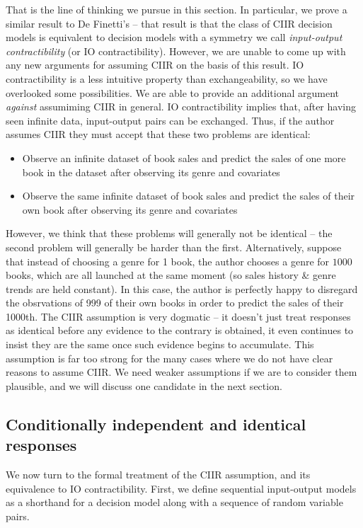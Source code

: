 That is the line of thinking we pursue in this section. In particular, we prove a similar result to De Finetti's -- that result is that the class of CIIR decision models is equivalent to decision models with a symmetry we call \emph{input-output contractibility} (or IO contractibility). However, we are unable to come up with any new arguments for assuming CIIR on the basis of this result. IO contractibility is a less intuitive property than exchangeability, so we have overlooked some possibilities. We are able to provide an additional argument \emph{against} assumiming CIIR in general. IO contractibility implies that, after having seen infinite data, input-output pairs can be exchanged. Thus, if the author assumes CIIR they must accept that these two problems are identical:
\begin{itemize}
    \item Observe an infinite dataset of book sales and predict the sales of one more book in the dataset after observing its genre and covariates
    \item Observe the same infinite dataset of book sales and predict the sales of their own book after observing its genre and covariates
\end{itemize}
However, we think that these problems will generally not be identical -- the second problem will generally be harder than the first. Alternatively, suppose that instead of choosing a genre for 1 book, the author chooses a genre for $1000$ books, which are all launched at the same moment (so sales history & genre trends are held constant). In this case, the author is perfectly happy to disregard the obsrvations of 999 of their own books in order to predict the sales of their 1000th. The CIIR assumption is very dogmatic -- it doesn't just treat responses as identical before any evidence to the contrary is obtained, it even continues to insist they are the same once such evidence begins to accumulate. This assumption is far too strong for the many cases where we do not have clear reasons to assume CIIR. We need weaker assumptions if we are to consider them plausible, and we will discuss one candidate in the next section.

\subsection[CIIR sequences]{Conditionally independent and identical responses}\label{sec:response_functions}

We now turn to the formal treatment of the CIIR assumption, and its equivalence to IO contractibility. First, we define sequential input-output models as a shorthand for a decision model along with a sequence of random variable pairs.


